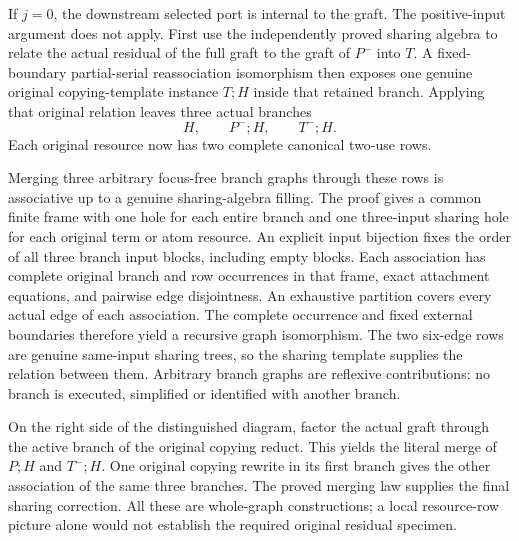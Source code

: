 If $j=0$, the downstream selected port is internal to the graft. The
positive-input argument does not apply. First use the independently proved
sharing algebra to relate the actual residual of the full graft to the
graft of $P^{-}$ into $T$. A fixed-boundary partial-serial reassociation
isomorphism then exposes one genuine original copying-template instance
$T;H$ inside that retained branch. Applying that original relation leaves
three actual branches
\[
 H,\qquad P^{-};H,\qquad T^{-};H.
\]
Each original resource now has two complete canonical two-use rows.

Merging three arbitrary focus-free branch graphs through these rows is
associative up to a genuine sharing-algebra filling. The proof gives a
common finite frame with one hole for each entire branch and one three-input
sharing hole for each original term or atom resource. An explicit input
bijection fixes the order of all three branch input blocks, including empty
blocks. Each association has complete original branch and row occurrences
in that frame, exact attachment equations, and pairwise edge disjointness.
An exhaustive partition covers every actual edge of each association.
The complete occurrence and fixed external boundaries therefore yield a
recursive graph isomorphism. The two six-edge rows are genuine same-input
sharing trees, so the sharing template supplies the relation between them.
Arbitrary branch graphs are reflexive contributions: no branch is executed,
simplified or identified with another branch.

On the right side of the distinguished diagram, factor the actual graft
through the active branch of the original copying reduct. This yields the
literal merge of $P;H$ and $T^{-};H$. One original copying rewrite in its
first branch gives the other association of the same three branches.
The proved merging law supplies the final sharing correction. All these
are whole-graph constructions; a local resource-row picture alone would
not establish the required original residual specimen.


\par{}
\par{}
\par{}
\par{}

